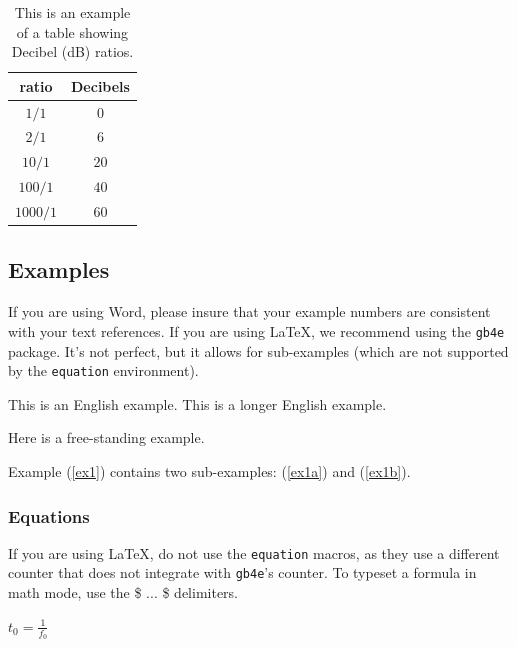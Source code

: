 \documentclass{tls}
\begin{document}
\begin{table}[ht]
  \begin{center}
    \begin{tabular}{|c|c|}
      \hline
      \rowcolor[gray]{.75}
      \hline
      ratio    & Decibels \\
      \hline
      $1/1$    & $0$   \\
      $2/1$    & $6$   \\
      $10/1$   & $20$  \\
      $100/1$  & $40$  \\
      $1000/1$ & $60$  \\
      \hline
    \end{tabular}
  \end{center}
  \caption{This is an example of a table showing Decibel (dB) ratios.}
  \label{tab:decibel}
\end{table}

\subsection{Examples}

If you are using Word, please insure that your example numbers are consistent with your text references. If you are using \LaTeX, we recommend using the \texttt{gb4e} package. It's not perfect, but it allows for sub-examples (which are not supported by the \texttt{equation} environment).

\begin{exe}
  \ex\label{ex1}
    \begin{xlist}
      \ex\label{ex1a} This is an English example.
      \ex\label{ex1b} This is a longer English example.
    \end{xlist}
  \ex\label{ex2} Here is a free-standing example.
\end{exe}

Example (\ref{ex1}) contains two sub-examples: (\ref{ex1a}) and (\ref{ex1b}).

\subsubsection{Equations}

If you are using \LaTeX, do not use the \texttt{equation} macros, as they use a different counter that does not integrate with \texttt{gb4e}'s counter. To typeset a formula in math mode, use the \$ ... \$ delimiters.

\begin{exe}
  \ex $t_0 = \frac{1}{f_0}$
\end{exe}
\end{document}
